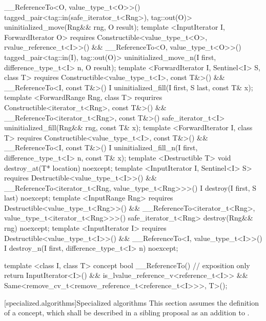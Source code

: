 {\begin{codeblock}
           __ReferenceTo<O, value_type_t<O>>()
    tagged_pair<tag::in(safe_iterator_t<Rng>), tag::out(O)>
    uninitialized_move(Rng&& rng, O result);
template <InputIterator I, ForwardIterator O>
  requires Constructible<value_type_t<O>, rvalue_reference_t<I>>() &&
           __ReferenceTo<O, value_type_t<O>>()
    tagged_pair<tag::in(I), tag::out(O)>
    uninitialized_move_n(I first, difference_type_t<I> n, O result);
template <ForwardIterator I, Sentinel<I> S, class T>
  requires Constructible<value_type_t<I>, const T&>() &&
           __ReferenceTo<I, const T&>()
  I uninitialized_fill(I first, S last, const T& x);
template <ForwardRange Rng, class T>
  requrires Constructible<iterator_t<Rng>, const T&>() &&
            __ReferenceTo<iterator_t<Rng>, const T&>()
  safe_iterator_t<I>
  uninitialized_fill(Rng&& rng, const T& x);
template <ForwardIterator I, class T>
  requires Constructible<value_type_t<I>, const T&>() &&
           __ReferenceTo<I, const T&>()
  I uninitialized_fill_n(I first, difference_type_t<I> n, const T& x);
template <Destructible T>
  void destroy_at(T* location) noexcept;
template <InputIterator I, Sentinel<I> S>
  requires Destructible<value_type_t<I>>() &&
           __ReferenceTo<iterator_t<Rng, value_type_t<Rng>>>()
    I destroy(I first, S last) noexcept;
template <InputRange Rng>
  requires Destructible<value_type_t<Rng>>() &&
           __ReferenceTo<iterator_t<Rng>, value_type_t<iterator_t<Rng>>>()
    safe_iterator_t<Rng> destroy(Rng&& rng) noexcept;
template <InputIterator I>
  requires Destructible<value_type_t<I>>() &&
           __ReferenceTo<I, value_type_t<I>>()
    I destroy_n(I first, difference_type_t<I> n) noexcept;

template <class I, class T>
concept bool __ReferenceTo() { // exposition only
  return InputIterator<I>() &&
    is_lvalue_reference_v<reference_t<I>> &&
    Same<remove_cv_t<remove_reference_t<reference_t<I>>>, T>();
}
\end{codeblock}
} %

\setcounter{subsection}{9}
[specialized.algorithms]{Specialized algorithms}
This section assumes the definition of a  concept, which shall be described in a sibling
proposal as an addition to .

